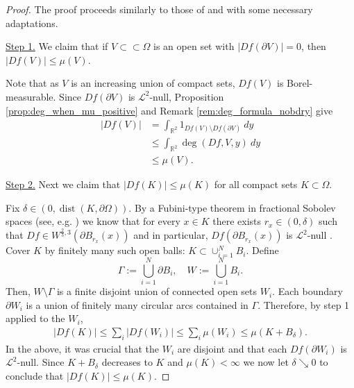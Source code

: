 \documentclass[12pt]{article}
\newcommand{\R}{\mathbb{R}}
\newcommand{\dist}{\operatorname{dist}}
\theoremstyle{plain}
\numberwithin{equation}{section}
\begin{document}
\begin{proof}
    The proof proceeds similarly to those of \cite[Proposition 3.1]{pakzad_24} and \cite[Theorem 3]{conti_deLellis_szekelyhidi_12} with some necessary adaptations. 
 
 \medskip
 \noindent\underline{Step 1.} We claim that if $V \subset\subset \Omega$ is an open set with $|Df(\partial V)| = 0$, then $
            |Df(V)| \leq \mu(V)$.
            
        Note that as $V$ is an increasing union of compact sets, $Df(V)$ is Borel-measurable. Since $Df(\partial V)$ is $\mathcal{L}^2$-null, Proposition \ref{prop:deg_when_mu_positive} and Remark \ref{rem:deg_formula_nobdry} give
        \begin{align*}
            |Df(V)| &= \int_{\R^2} 1_{Df(V) \setminus Df(\partial V)}~dy\\
            &\leq \int_{\R^2} \deg(Df, V,y)~dy\\
            &\leq \mu(V).
        \end{align*}

\medskip
 \noindent\underline{Step 2.} Next we claim that $|Df(K)| \leq \mu(K)$ for all compact sets $K \subset \Omega$. 
 
 Fix $\delta \in (0, \dist(K,\partial \Omega))$. By a Fubini-type theorem in fractional Sobolev spaces (see, e.g. \cite[Lemma 2.2]{li_schikorra}) we know that for every $x \in K$ there exists $r_x \in (0,\delta)$ such that $Df \in W^{\frac23,3}(\partial B_{r_x} (x))$ and in particular, $Df(\partial B_{r_x}(x))$ is $\mathcal{L}^2$-null \cite[Theorem B.1]{li_pakzad_schikorra_21}. Cover $K$ by finitely many such open balls: $K \subset \cup_{i=1}^N B_i$. Define
        \begin{equation*}
            \Gamma := \bigcup_{i=1}^N \partial B_i, \quad W := \bigcup_{i=1}^N B_i.
        \end{equation*}
        Then, $W \setminus \Gamma$ is a finite disjoint union of connected open sets $W_i$. Each boundary $\partial W_i$ is a union of finitely many circular arcs contained in $\Gamma$. Therefore, by step 1 applied to the $W_i$,
        \begin{align*}
            |Df(K)| \leq \sum_i |Df(W_i)| \leq \sum_i \mu(W_i) \leq \mu(K + B_\delta).
        \end{align*}
        In the above, it was crucial that the $W_i$ are disjoint and that each $Df(\partial W_i)$ is $\mathcal{L}^2$-null. Since $K + B_\delta$ decreases to $K$ and $\mu(K) < \infty$ we now let $\delta \searrow 0$ to conclude that $|Df(K)| \leq \mu(K)$.


\end{proof}
\end{document}
